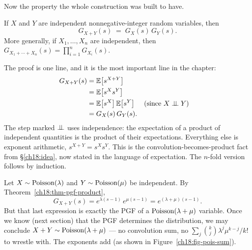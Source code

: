 Now the property the whole construction was built to have.

\begin{theorem}
\label{ch18:thm-pgf-product}
If $X$ and $Y$ are independent nonnegative-integer random variables, then
\[
  G_{X+Y}(s) \;=\; G_X(s)\,G_Y(s).
\]
More generally, if $X_1,\dots,X_n$ are independent, then $G_{X_1+\cdots+X_n}(s)
= \prod_{i=1}^n G_{X_i}(s)$.
\end{theorem}

\begin{whybox}
The proof is one line, and it is the most important line in the chapter:
\begin{align*}
  G_{X+Y}(s) &= \operatorname{\mathbb{E}}\!\left[s^{X+Y}\right] \\
             &= \operatorname{\mathbb{E}}\!\left[s^{X}s^{Y}\right] \\
             &= \operatorname{\mathbb{E}}\!\left[s^{X}\right]\operatorname{\mathbb{E}}\!\left[s^{Y}\right] && \text{(since $X \perp\!\!\!\perp Y$)} \\
             &= G_X(s)\,G_Y(s).
\end{align*}
The step marked $\perp\!\!\!\perp$ uses independence: the expectation of a product of
independent quantities is the product of their expectations. Everything else is
exponent arithmetic, $s^{X+Y}=s^X s^Y$. This is the convolution-becomes-product
fact from \S\ref{ch18:idea}, now stated in the language of expectation.
The $n$-fold version follows by induction.
\end{whybox}

\begin{example}
\label{ch18:ex-pois-sum}
Let $X\sim\operatorname{Poisson}(\lambda)$ and $Y\sim\operatorname{Poisson}(\mu)$ be independent. By
Theorem~\ref{ch18:thm-pgf-product},
\[
  G_{X+Y}(s) = e^{\lambda(s-1)}\,e^{\mu(s-1)} = e^{(\lambda+\mu)(s-1)} .
\]
But that last expression is exactly the PGF of a $\operatorname{Poisson}(\lambda+\mu)$ variable.
Once we know (next section) that the PGF determines the distribution, we may
conclude $X+Y\sim\operatorname{Poisson}(\lambda+\mu)$ --- no convolution sum, no
$\sum_{j}\binom{k}{j}\lambda^j\mu^{k-j}/k!$ to wrestle with. The exponents add (as shown in Figure~\ref{ch18:fig-pois-sum}).
\end{example}

